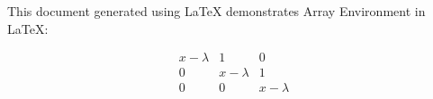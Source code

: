 \documentclass{article}
\begin{document}
This document generated using LaTeX demonstrates Array Environment in LaTeX:

\[
\begin{array}{ccc}
x-\lambda & 1 & 0 \\
0 & x-\lambda & 1 \\
0 & 0 & x-\lambda
\end{array}
\]
\end{document}
